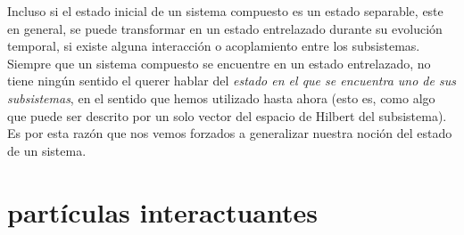 \documentclass[12pt]{book}
\numberwithin{equation}{chapter}
\begin{document}
\rightline{$\dag$}
\vspace{3 mm}

Incluso si el estado inicial de un sistema compuesto es un estado separable, este en general, se puede transformar en un estado entrelazado durante su evoluci\'on temporal, si existe alguna interacci\'on o acoplamiento entre los subsistemas. Siempre que un sistema compuesto se encuentre en un estado entrelazado, no tiene ning\'un sentido el querer hablar del \emph{estado en el que se encuentra uno de sus subsistemas}, en el sentido que hemos utilizado hasta ahora (esto es, como algo que puede ser descrito por un solo vector del espacio de Hilbert del subsistema). Es por esta raz\'on que nos vemos forzados a generalizar nuestra noci\'on del estado de un sistema. 

\section{part\'iculas interactuantes}
\end{document}

